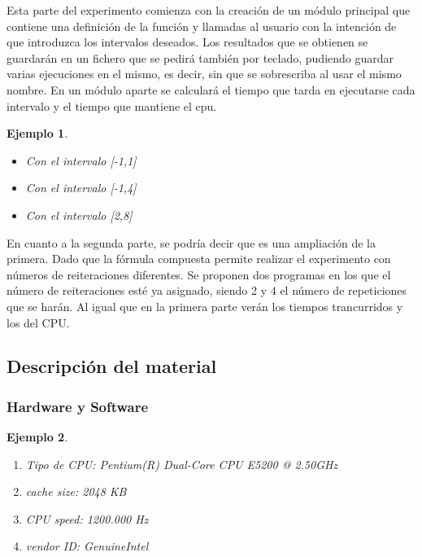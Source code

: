 \documentclass{beamer}
\newtheorem{ejemplo}{Ejemplo}
\begin{document}
\begin{frame}
Esta parte del experimento comienza con la creación de un módulo principal que contiene una definición de la función y llamadas al usuario
con la intención de que introduzca los intervalos deseados. Los resultados que se obtienen se guardarán en un fichero que se pedirá también por teclado, 
pudiendo guardar varias ejecuciones en el mismo, es decir, sin que se sobrescriba al usar el mismo nombre.
En un módulo aparte se calculará el tiempo que tarda en ejecutarse cada intervalo y el tiempo que mantiene el cpu.

\begin{ejemplo}
  \begin{itemize}
 \item Con el intervalo [-1,1]
    \item Con el intervalo [-1,4]
    \item Con el intervalo [2,8]
  \end{itemize}
\end{ejemplo}

\end{frame}

\begin{frame}
\begin{block}{}
 En cuanto a la segunda parte, se podría decir que es una ampliación de la primera. Dado que la fórmula compuesta permite realizar el experimento con 
números de reiteraciones diferentes. Se proponen dos programas en los que el número de reiteraciones esté ya asignado, siendo 2 y 4 el número de 
repeticiones que se harán.
Al igual que en la primera parte verán los tiempos trancurridos y los del CPU.
\end{block}
\end{frame}



\subsection{Descripción del material}
\begin{frame}
\frametitle{Hardware y Software}

\begin{ejemplo}
  \begin{enumerate}
\item Tipo de CPU: Pentium(R) Dual-Core  CPU      E5200  @ 2.50GHz 
\pause 
\item cache size: 2048 KB 
\pause
\item CPU speed: 1200.000 Hz 
\pause
\item
vendor ID: GenuineIntel 
\pause
      
  \end{enumerate}
\end{ejemplo}

\end{frame}
\end{document}
